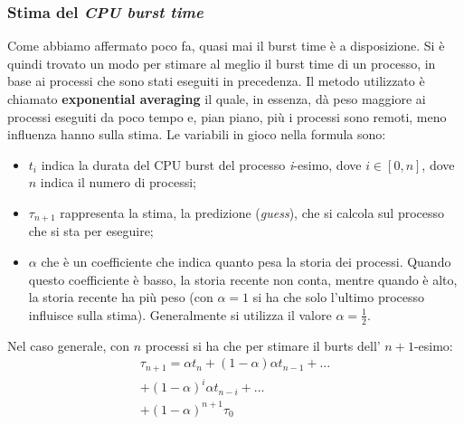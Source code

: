 \subsubsection{Stima del \textit{CPU burst time}}
Come abbiamo affermato poco fa, quasi mai il burst time è a disposizione. Si è quindi trovato un modo per stimare al meglio il burst time di un processo, in base ai processi che sono stati eseguiti in precedenza. Il metodo utilizzato è chiamato \textbf{exponential averaging} il quale, in essenza, dà peso maggiore ai processi eseguiti da poco tempo e, pian piano, più i processi sono remoti, meno influenza hanno sulla stima. Le variabili in gioco nella formula sono:
\vspace{-5px}
\begin{itemize}
\setlength{\itemsep}{-.15 em}
    \item $t_i$ indica la durata del CPU burst del processo \textit{i}-esimo, dove $i\in[0,n]$, dove $n$ indica il numero di processi;
    \item $\tau_{n+1}$ rappresenta la stima, la predizione (\textit{guess}), che si calcola sul processo che si sta per eseguire;
    \item $\alpha$ che è un coefficiente che indica quanto pesa la storia dei processi. Quando questo coefficiente è basso, la storia recente non conta, mentre quando è alto, la storia recente ha più peso (con $\alpha = 1$ si ha che solo l'ultimo processo influisce sulla stima). Generalmente si utilizza il valore $\alpha = \frac{1}{2}$.
\end{itemize}
Nel caso generale, con $n$ processi si ha che per stimare il burts dell' $n+1$-esimo:
\begin{gather*}
    \tau_{n + 1} = \alpha t_n + (1 - \alpha)\alpha t_{n - 1} + ... \\
                    + (1 - \alpha)^i\alpha t_{n - i} + ...\\
                    + (1 - \alpha)^{n + 1}\tau_0
\end{gather*}

